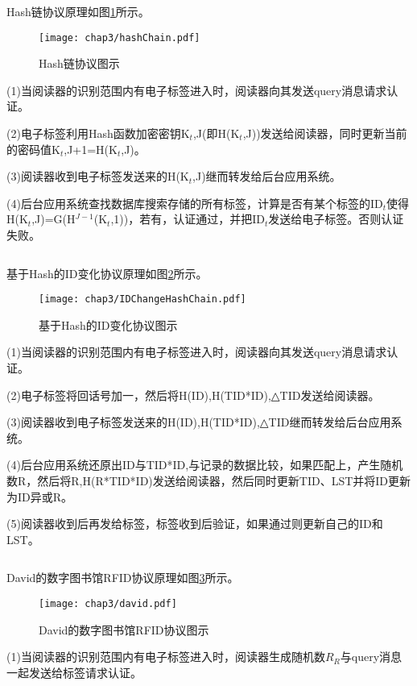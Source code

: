 \[\]

Hash链协议原理如图\ref{fig:Hash链协议图示}所示。

\begin{figure}[H]
	\centering
	\texttt{[image: chap3/hashChain.pdf]}
	\caption{Hash链协议图示}\label{fig:Hash链协议图示}
\end{figure}

(1)当阅读器的识别范围内有电子标签进入时，阅读器向其发送query消息请求认证。

(2)电子标签利用Hash函数加密密钥K$_{t}$,J(即H(K$_{t}$,J))发送给阅读器，同时更新当前的密码值K$_{t}$,J+1=H(K$_{t}$,J)。

(3)阅读器收到电子标签发送来的H(K$_{t}$,J)继而转发给后台应用系统。

(4)后台应用系统查找数据库搜索存储的所有标签，计算是否有某个标签的ID$_{t}$使得H(K$_{t}$,J)=G(H$^{J-1}$(K$_{t}$,1))，若有，认证通过，并把ID$_{t}$发送给电子标签。否则认证失败。

\[\]

基于Hash的ID变化协议原理如图\ref{fig:基于Hash的ID变化协议图示}所示。

\begin{figure}[H]
	\centering
	\texttt{[image: chap3/IDChangeHashChain.pdf]}
	\caption{基于Hash的ID变化协议图示}\label{fig:基于Hash的ID变化协议图示}
\end{figure}

(1)当阅读器的识别范围内有电子标签进入时，阅读器向其发送query消息请求认证。

(2)电子标签将回话号加一，然后将H(ID),H(TID*ID),△TID发送给阅读器。

(3)阅读器收到电子标签发送来的H(ID),H(TID*ID),△TID继而转发给后台应用系统。

(4)后台应用系统还原出ID与TID*ID,与记录的数据比较，如果匹配上，产生随机数R，然后将R,H(R*TID*ID)发送给阅读器，然后同时更新TID、LST并将ID更新为ID异或R。

(5)阅读器收到后再发给标签，标签收到后验证，如果通过则更新自己的ID和LST。

\[\]

David的数字图书馆RFID协议原理如图\ref{fig:David的数字图书馆RFID协议图示}所示。

\begin{figure}[H]
	\centering
	\texttt{[image: chap3/david.pdf]}
	\caption{David的数字图书馆RFID协议图示}\label{fig:David的数字图书馆RFID协议图示}
\end{figure}

(1)当阅读器的识别范围内有电子标签进入时，阅读器生成随机数$R_{R}$与query消息一起发送给标签请求认证。

